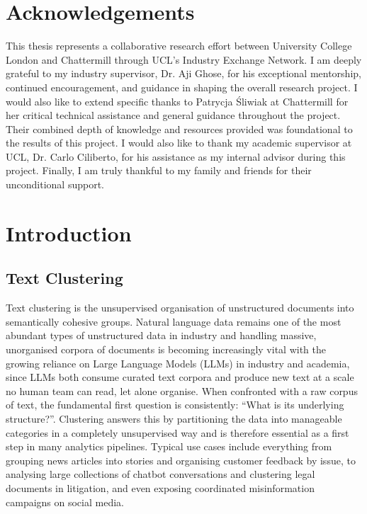 \documentclass[11pt,a4paper,oneside]{report}
\begin{document}
\clearpage
\chapter*{Acknowledgements}

This thesis represents a collaborative research effort between University College London and Chattermill through UCL's Industry Exchange Network. I am deeply grateful to my industry supervisor, Dr. Aji Ghose, for his exceptional mentorship, continued encouragement, and guidance in shaping the overall research project. I would also like to extend specific thanks to Patrycja Śliwiak at Chattermill for her critical technical assistance and general guidance throughout the project. Their combined depth of knowledge and resources provided was foundational to the results of this project.  I would also like to thank my academic supervisor at UCL, Dr. Carlo Ciliberto, for his assistance as my internal advisor during this project. Finally, I am truly thankful to my family and friends for their unconditional support.

\clearpage
\tableofcontents
\clearpage
\listoffigures
\clearpage
\listoftables

\clearpage
{}
\chapter{Introduction}

\section{Text Clustering}

Text clustering is the unsupervised organisation of unstructured documents into semantically cohesive groups. Natural language data remains one of the most abundant types of unstructured data in industry and handling massive, unorganised corpora of documents is becoming increasingly vital with the growing reliance on Large Language Models (LLMs) in industry and academia, since LLMs both consume curated text corpora and produce new text at a scale no human team can read, let alone organise. When confronted with a raw corpus of text, the fundamental first question is consistently: ``What is its underlying structure?''. Clustering answers this by partitioning the data into manageable categories in a completely unsupervised way and is therefore essential as a first step in many analytics pipelines. Typical use cases include everything from grouping news articles into stories and organising customer feedback by issue, to analysing large collections of chatbot conversations and clustering legal documents in litigation, and even exposing coordinated misinformation campaigns on social media.
\end{document}

